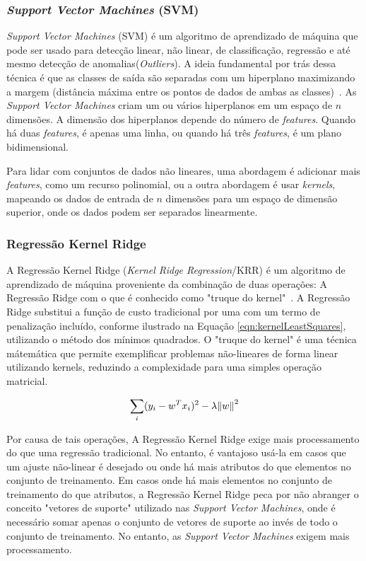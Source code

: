 \documentclass[portugues]{ic-tese}
\begin{document}
\subsubsection{\textit{Support Vector Machines} (SVM)}

\textit{Support Vector Machines} (SVM) é um algoritmo de aprendizado de máquina que pode ser usado para detecção linear, não linear, de classificação, regressão e até mesmo detecção de anomalias(\textit{Outliers}). A ideia fundamental por trás dessa técnica é que as classes de saída são separadas com um hiperplano maximizando a margem (distância máxima entre os pontos de dados de ambas as classes)~\citep{Steinwart_2008}. As \textit{Support Vector Machines} criam um ou vários hiperplanos em um espaço de $n$ dimensões. A dimensão dos hiperplanos depende do número de \textit{features}. Quando há duas \textit{features}, é apenas uma linha, ou quando há três \textit{features}, é um plano bidimensional.

Para lidar com conjuntos de dados não lineares, uma abordagem é adicionar mais \textit{features}, como um recurso polinomial, ou a outra abordagem é usar \textit{kernels}, mapeando os dados de entrada de $n$ dimensões para um espaço de dimensão superior, onde os dados podem ser separados linearmente.

\subsubsection{Regressão Kernel Ridge}

A Regressão Kernel Ridge (\textit{Kernel Ridge Regression}/KRR) é um algoritmo de aprendizado de máquina proveniente da combinação de duas operações: A Regressão Ridge com o que é conhecido como "truque do kernel"~\citep{Witten_2016}. A Regressão Ridge substitui a função de custo tradicional por uma com um termo de penalização incluído, conforme ilustrado na Equação \ref{eqn:kernelLeastSquares}, utilizando o método dos mínimos quadrados. O "truque do kernel" é uma técnica mátemática que permite exemplificar problemas não-lineares de forma linear utilizando kernels, reduzindo a complexidade para uma simples operação matricial.

\begin{equation}
\label{eqn:kernelLeastSquares}
\sum_{i} (y_{i} - w^{T}x_i)^{2} - \lambda \norm{w}^{2}
\end{equation}

Por causa de tais operações, A Regressão Kernel Ridge exige mais processamento do que uma regressão tradicional. No entanto, é vantajoso usá-la em casos que um ajuste não-linear é desejado ou onde há mais atributos do que elementos no conjunto de treinamento. Em casos onde há mais elementos no conjunto de treinamento do que atributos, a Regressão Kernel Ridge peca por não abranger o conceito "vetores de suporte" utilizado nas \textit{Support Vector Machines}, onde é necessário somar apenas o conjunto de vetores de suporte ao invés de todo o conjunto de treinamento. No entanto, as \textit{Support Vector Machines} exigem mais processamento.
\end{document}
